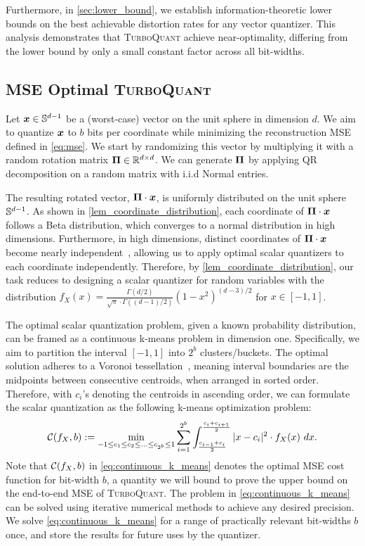\documentclass[11pt]{article}
\newcommand{\TurboQuant}{\textsc{TurboQuant}\xspace}
\begin{document}
Furthermore, in \cref{sec:lower_bound}, we establish information-theoretic lower bounds on the best achievable distortion rates for any vector quantizer. 
This analysis demonstrates that \TurboQuant achieve near-optimality, differing from the lower bound by only a small constant factor across all bit-widths.


\subsection{MSE Optimal \TurboQuant} \label{sec:mse_turbo_alg}
Let ${\bm x} \in \mathbb{S}^{d-1}$ be a (worst-case) vector on the unit sphere in dimension $d$.
We aim to quantize ${\bm x}$ to $b$ bits per coordinate while minimizing the reconstruction MSE defined in \cref{eq:mse}.
We start by randomizing this vector by multiplying it with a random rotation matrix $\boldsymbol{\Pi} \in \mathbb{R}^{d \times d}$. 
We can generate $\boldsymbol{\Pi}$ by applying QR decomposition on a random matrix with i.i.d Normal entries.

The resulting rotated vector, $\boldsymbol{\Pi} \cdot {\bm x}$, is uniformly distributed on the unit sphere $\mathbb{S}^{d-1}$.
As shown in \cref{lem_coordinate_distribution}, each coordinate of $\boldsymbol{\Pi} \cdot {\bm x}$ follows a Beta distribution, which converges to a normal distribution in high dimensions.
Furthermore, in high dimensions, distinct coordinates of $\boldsymbol{\Pi} \cdot {\bm x}$ become nearly independent~\cite{vershynin2018high}, allowing us to apply optimal scalar quantizers to each coordinate independently.
Therefore, by \cref{lem_coordinate_distribution}, our task reduces to designing a scalar quantizer for random variables with the distribution $f_{X}(x) = \frac{\Gamma(d/2)}{\sqrt{\pi} \cdot \Gamma((d-1)/2)} \left( 1 - x^2 \right)^{(d-3)/2}$ for $x \in [-1, 1]$.

The optimal scalar quantization problem, given a known probability distribution, can be framed as a continuous k-means problem in dimension one. 
Specifically, we aim to partition the interval $[-1, 1]$ into $2^b$ clusters/buckets.
The optimal solution adheres to a Voronoi tessellation~\cite{lloyd1982least}, meaning interval boundaries are the midpoints between consecutive centroids, when arranged in sorted order.
Therefore, with $c_i$'s denoting the centroids in ascending order, we can formulate the scalar quantization as the following k-means optimization problem:
\begin{equation}\label{eq:continuous_k_means}
    \mathcal{C}(f_X, b) := \min_{-1 \le c_1 \le c_2 \le \ldots \le c_{2^b} \le 1} \sum_{i=1}^{2^b} \int_{\frac{c_{i-1} + c_i}{2}}^{\frac{c_i + c_{i+1}}{2}} |x - c_i|^2 \cdot f_X(x)~dx.
\end{equation}
Note that $\mathcal{C}(f_X, b)$ in \cref{eq:continuous_k_means} denotes the optimal MSE cost function for bit-width $b$, a quantity we will bound to prove the upper bound on the end-to-end MSE of \TurboQuant.
The problem in \cref{eq:continuous_k_means} can be solved using iterative numerical methods to achieve any desired precision.
We solve \cref{eq:continuous_k_means} for a range of practically relevant bit-widths $b$ once, and store the results for future uses by the quantizer.
\end{document}
